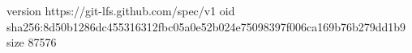 version https://git-lfs.github.com/spec/v1
oid sha256:8d50b1286dc455316312fbc05a0e52b024e75098397f006ca169b76b279dd1b9
size 87576
